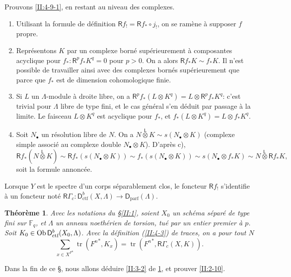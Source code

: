 \documentclass{book}
\DeclareMathOperator{\ob}{Ob}
\DeclareMathOperator{\tr}{tr}
\newcommand{\dF}{\mathbb{F}}
\newcommand{\R}{\mathsf{R}}
\newcommand{\D}{\mathsf{D}}
\newcommand{\lotimes}{{\overset{\mathsf{L}}{\otimes}}}
\newtheorem{theorem_}[subsection]{Théorème}
\begin{document}
Prouvons \eqref{II:4-9-1}, en restant au niveau des complexes. 
\begin{enumerate}[\indent a)]
  \item Utilisant la formule de d\'efinition $\R f_! = \R f_*\circ j_!$, on se 
    ram\`ene \`a supposer $f$ propre. 
  \item Repr\'esentons $K$ par un complexe born\'e 
    sup\'erieurement \`a composantes acyclique pour $f_*:\R^p f_* K^q = 0$ 
    pour $p>0$. On a alors $\R f_* K \sim f_* K$. Il n'est possible de 
    travailler ainsi avec des complexes born\'es sup\'erieurement que parce que 
    $f_*$ est de dimension cohomologique finie. 
  \item Si $L$ un $\Lambda$-module \`a droite libre, on a 
    $\R^p f_*(L\otimes K^q) = L\otimes \R^p f_* K^q$: c'est trivial pour 
    $\Lambda$ libre de type fini, et le cas g\'en\'eral s'en d\'eduit par 
    passage \`a la limite. Le faisceau $L\otimes K^q$ est acyclique pour 
    $f_*$, et $f_*(L\otimes K^q) = L\otimes f_* K^q$. 
  \item Soit $N_\bullet$ un r\'esolution libre de $N$. On a 
    $N\lotimes K\sim s(N_\bullet\otimes K)$ (complexe simple associ\'e au 
    complexe double $N_\bullet\otimes K$). D'apr\`es c), 
    \[
      \R f_*(N\lotimes K) \sim \R f_* (s(N_\bullet\otimes K)) \sim f_*(s(N_\bullet\otimes K)) \sim s(N_\bullet\otimes f_* K) \sim N\lotimes \R f_* K \text{,}
    \]
    soit la formule annonc\'ee. 
\end{enumerate}

Lorsque $Y$ est le spectre d'un corps s\'eparablement clos, le foncteur $\R f_!$ 
s'identifie \`a un foncteur not\'e 
$\R \Gamma_c : \D_\text{ctf}^b(X,\Lambda)\to\D_\text{parf}(\Lambda)$. 





\begin{theorem_}\label{II:4-10}
Avec les notations du \S\ref{II:1}, soient $X_0$ un sch\'ema s\'epar\'e de type 
fini sur $\dF_q$, et $\Lambda$ un anneau noeth\'erien de torsion, tu\'e par un 
entier premier \`a $p$. Soit $K_0\in\ob\D_\textnormal{ctf}^b(X_0,\Lambda)$. 
Avec la d\'efinition (\ref{II:4-3}) de traces, on a pour tout $N$ 
\begin{equation}\label{II:eq:4-10}
  \sum_{x\in X^{F^n}} \tr\left({F^n}^*,K_x\right) = \tr\left({F^n}^*,\R\Gamma_c(X,K)\right) \text{.}
\end{equation}
\end{theorem_}

Dans la fin de ce \S, nous allons d\'eduire \ref{II:3-2} de \ref{II:4-10}, et 
prouver \ref{II:2-10}. 
\end{document}
